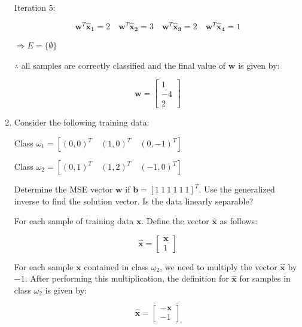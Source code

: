 \documentclass[fleqn]{article}
\begin{document}
\begin{enumerate}
		Iteration 5:
		
		\begin{equation*}
			\mathbf{w}^T\mathbf{\hat{x}_1} = 2 \quad \mathbf{w}^T\mathbf{\hat{x}_2} = 3 \quad \mathbf{w}^T\mathbf{\hat{x}_3} = 2 \quad \mathbf{w}^T\mathbf{\hat{x}_4} = 1
		\end{equation*}
		
		$\Rightarrow E = \{\emptyset\}$
		
		$\therefore$ all samples are correctly classified and the final value of $\mathbf{w}$ is given by:
		
		\begin{equation*}
			\mathbf{w} = \begin{bmatrix}1 \\ -4 \\ 2\end{bmatrix}
		\end{equation*}
		
		\item Consider the following training data:
		
		Class $\omega_1 = [(0,0)^T\quad(1,0)^T\quad(0,-1)^T]$
		
		Class $\omega_2 = [(0,1)^T\quad(1,2)^T\quad(-1,0)^T]$
		
		Determine the MSE vector $\mathbf{w}$ if $\mathbf{b} = [1\:1\:1\:1\:1\:1]^T$. Use the generalized inverse to find the solution vector. Is the data linearly separable?
		
		For each sample of training data $\mathbf{x}$. Define the vector $\mathbf{\hat{x}}$ as follows:
		
		\begin{equation*}
			\mathbf{\hat{x}} = \begin{bmatrix} \mathbf{x} \\ 1 \end{bmatrix}			
		\end{equation*}
		
		For each sample $\mathbf{x}$ contained in class $\omega_2$, we need to multiply the vector $\mathbf{\hat{x}}$ by $-1$. After performing this multiplication, the definition for $\mathbf{\hat{x}}$  for samples in class $\omega_2$ is given by:
		
		\begin{equation*}
			\mathbf{\hat{x}} = \begin{bmatrix} -\mathbf{x} \\ -1 \end{bmatrix}			
		\end{equation*}
		

\end{enumerate}
\end{document}

